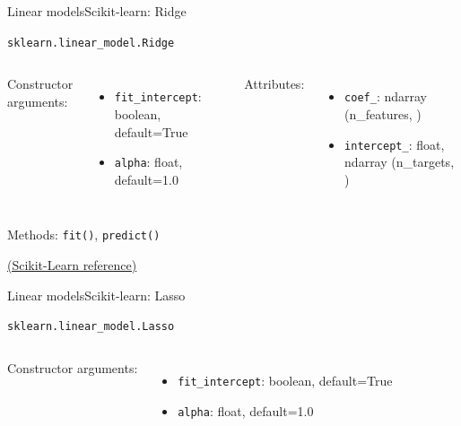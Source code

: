 \documentclass[10pt,compress]{beamer} %
\begin{document}
{    \begin{frame}{Linear models}{Scikit-learn: Ridge}
        \begin{exampleblock}{\texttt{sklearn.linear\_model.Ridge}}
         \medskip

         \begin{columns}[T]
                Constructor arguments:
                \begin{itemize}
                    \item \texttt{fit\_intercept}: boolean, default=True
                    \item \texttt{alpha}: float, default=1.0
                \end{itemize}

                Attributes:
                \begin{itemize}
                    \item \texttt{coef\_}:  ndarray (n\_features, )
                    \item \texttt{intercept\_}:  float, ndarray (n\_targets, )
                \end{itemize}
            \end{columns}

            \medskip

            Methods: \texttt{fit()}, \texttt{predict()}
        \end{exampleblock}

        \medskip
        \centering \href{https://scikit-learn.org/stable/modules/generated/sklearn.linear_model.Ridge.html}{(Scikit-Learn reference)}
    \end{frame}

    \begin{frame}{Linear models}{Scikit-learn: Lasso}
        \begin{exampleblock}{\texttt{sklearn.linear\_model.Lasso}}
         \medskip

         \begin{columns}[T]
                Constructor arguments:
                \begin{itemize}
                    \item \texttt{fit\_intercept}: boolean, default=True
                    \item \texttt{alpha}: float, default=1.0
                \end{itemize}


\end{columns}
\end{exampleblock}
\end{frame}}
\end{document}
